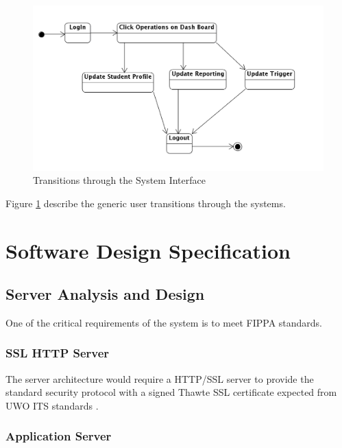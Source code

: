 \documentclass{journal}
\begin{document}
\begin{figure}[htp]                                                             
\centering                                                                      
\includegraphics[scale=0.25]{diagrams/statechart_uc.png}
\caption{Transitions through the System Interface}                              
\label{fig:Transitions}   
\end{figure}                                                                    
             
Figure \ref{fig:Transitions} describe the generic user transitions through the systems. 


\section{Software Design Specification}

\subsection{Server Analysis and Design}
One of the critical requirements of the system is to meet FIPPA standards. 
\subsubsection{SSL HTTP Server}

The server architecture would require a HTTP/SSL server to provide the standard security protocol with a signed Thawte SSL certificate expected from UWO ITS standards \cite{ITS}.

\subsubsection{Application Server}
\end{document}

